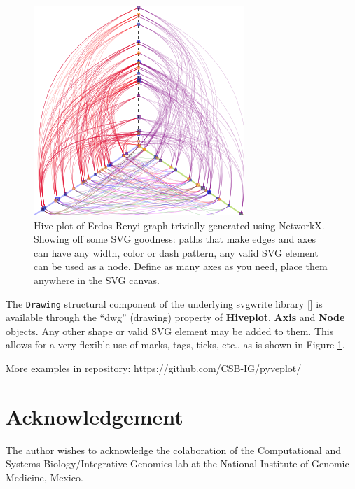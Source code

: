 \documentclass{bioinfo}
\begin{document}
\begin{figure}[h!]
  \centerline{\includegraphics[scale=0.7]{example.png}}
  \caption{Hive plot of Erdos-Renyi graph trivially generated using
    NetworkX. Showing off some SVG goodness: paths that make edges
    and axes can have any width, color or dash pattern, any valid SVG
    element can be used as a node. Define as many axes as you need,
    place them anywhere in the SVG canvas.}
  \label{fig:01}
\end{figure}

The \verb"Drawing" structural component of the underlying svgwrite
library [\cite{svgwrite}] is available through the ``dwg'' (drawing)
property of {\bfseries Hiveplot}, {\bfseries Axis} and {\bfseries
  Node} objects. Any other shape or valid SVG element may be added to
them. This allows for a very flexible use of marks, tags, ticks, etc.,
as is shown in Figure \ref{fig:01}.

More examples in repository: https://github.com/CSB-IG/pyveplot/



\section*{Acknowledgement}
The author wishes to acknowledge the colaboration of the Computational and Systems
Biology/Integrative Genomics lab at the National Institute of Genomic
Medicine, Mexico.



\end{document}
